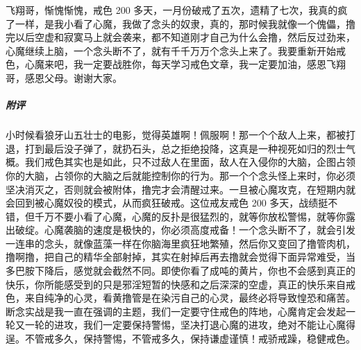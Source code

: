 \begin{case}
    飞翔哥，惭愧惭愧，戒色 200 多天，一月份破戒了五次，遗精了七次，我真的疯了一样，是我小看了心魔，我做了念头的奴隶，真的，那时候我就像一个傀儡，撸完以后空虚和寂寞马上就会袭来，都不知道刚才自己为什么会撸，然后反过劲来，心魔继续上脑，一个念头断不了，就有千千万万个念头上来了。我要重新开始戒色，心魔来吧，我一定要战胜你，每天学习戒色文章，我一定要加油，感恩飞翔哥，感恩父母。谢谢大家。
    \subparagraph{附评} 小时候看狼牙山五壮士的电影，觉得英雄啊！佩服啊！那一个个敌人上来，都被打退，打到最后没子弹了，就扔石头，总之拒绝投降，这真是一种视死如归的烈士气概。我们戒色其实也是如此，只不过敌人在里面，敌人在入侵你的大脑，企图占领你的大脑，占领你的大脑之后就能控制你的行为。那一个个念头怪上来时，你必须坚决消灭之，否则就会被附体，撸完才会清醒过来。一旦被心魔攻克，在短期内就会回到被心魔奴役的模式，从而疯狂破戒。这位戒友戒色 200 多天，战绩挺不错，但千万不要小看了心魔，心魔的反扑是很猛烈的，就等你放松警惕，就等你露出破绽。心魔袭脑的速度是极快的，你必须高度戒备！一个念头断不了，就会引发一连串的念头，就像蓝藻一样在你脑海里疯狂地繁殖，然后你又变回了撸管肉机，撸啊撸，把自己的精华全部射掉，其实在射掉后再去撸就会觉得下面异常难受，当多巴胺下降后，感觉就会截然不同。即使你看了成吨的黄片，你也不会感到真正的快乐，你所能感受到的只是邪淫短暂的快感和之后深深的空虚，真正的快乐来自戒色，来自纯净的心灵，看黄撸管是在染污自己的心灵，最终必将导致惶恐和痛苦。断念实战是我一直在强调的主题，我们一定要守住戒色的阵地，心魔肯定会发起一轮又一轮的进攻，我们一定要保持警惕，坚决打退心魔的进攻，绝对不能让心魔得逞。不管戒多久，保持警惕，不管戒多久，保持谦虚谨慎！戒骄戒躁，稳健戒色。
\end{case}

